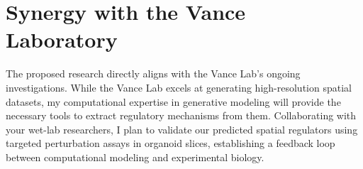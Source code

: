 \section{Synergy with the Vance Laboratory}
The proposed research directly aligns with the Vance Lab's ongoing investigations. While the Vance Lab excels at generating high-resolution spatial datasets, my computational expertise in generative modeling will provide the necessary tools to extract regulatory mechanisms from them. Collaborating with your wet-lab researchers, I plan to validate our predicted spatial regulators using targeted perturbation assays in organoid slices, establishing a feedback loop between computational modeling and experimental biology.
